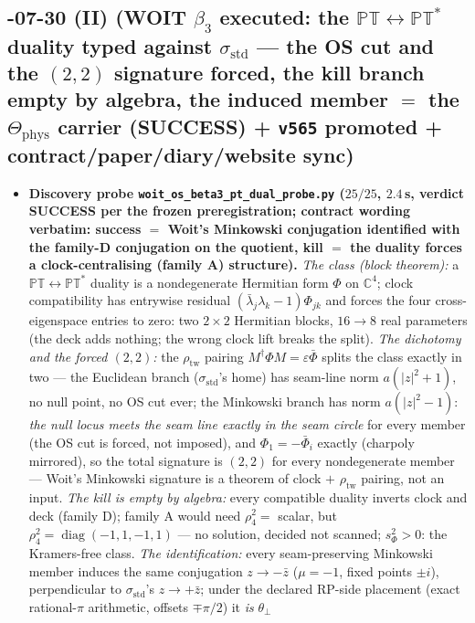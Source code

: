 \subsection*{-07-30 (II) (WOIT $\beta_3$ executed: the $\mathbb{PT}\leftrightarrow\mathbb{PT}^*$ duality typed against $\sigma_{\mathrm{std}}$ --- the OS cut and the $(2,2)$ signature forced, the kill branch empty by algebra, the induced member $=$ the $\Theta_{\mathrm{phys}}$ carrier (SUCCESS) + \texttt{v565} promoted + contract/paper/diary/website sync)}
\begin{itemize}[leftmargin=1.5em]
\item \textbf{Discovery probe \texttt{woit\_os\_beta3\_pt\_dual\_probe.py} ($25/25$, $2.4$\,s,
verdict SUCCESS per the frozen preregistration; contract wording verbatim: success $=$ Woit's
Minkowski conjugation identified with the family-D conjugation on the quotient, kill $=$ the
duality forces a clock-centralising (family A) structure).} \emph{The class (block theorem):}
a $\mathbb{PT}\leftrightarrow\mathbb{PT}^*$ duality is a nondegenerate Hermitian form $\Phi$
on $\mathbb{C}^4$; clock compatibility has entrywise residual $(\bar\lambda_j\lambda_k-1)\Phi_{jk}$
and forces the four cross-eigenspace entries to zero: two $2\times2$ Hermitian blocks,
$16\to8$ real parameters (the deck adds nothing; the wrong clock lift breaks the split).
\emph{The dichotomy and the forced $(2,2)$:} the $\rho_{\mathrm{tw}}$ pairing
$M^\dagger\Phi M=\varepsilon\bar\Phi$ splits the class exactly in two --- the Euclidean
branch ($\sigma_{\mathrm{std}}$'s home) has seam-line norm $a(|z|^2+1)$, no null point, no OS
cut ever; the Minkowski branch has norm $a(|z|^2-1)$: \emph{the null locus meets the seam
line exactly in the seam circle} for every member (the OS cut is forced, not imposed), and
$\Phi_1=-\bar\Phi_i$ exactly (charpoly mirrored), so the total signature is $(2,2)$ for every
nondegenerate member --- Woit's Minkowski signature is a theorem of clock $+$
$\rho_{\mathrm{tw}}$ pairing, not an input. \emph{The kill is empty by algebra:} every
compatible duality inverts clock and deck (family D); family A would need $\rho_4^2=$
scalar, but $\rho_4^2=\operatorname{diag}(-1,1,-1,1)$ --- no solution, decided not scanned;
$s_\Phi^2>0$: the Kramers-free class. \emph{The identification:} every seam-preserving
Minkowski member induces the same conjugation $z\to-\bar z$ ($\mu=-1$, fixed points $\pm i$),
perpendicular to $\sigma_{\mathrm{std}}$'s $z\to+\bar z$; under the declared RP-side
placement (exact rational-$\pi$ arithmetic, offsets $\mp\pi/2$) it \emph{is} $\theta_\perp$

\end{itemize}

